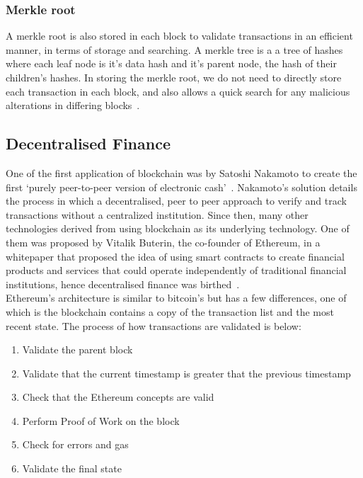 \subsubsection{Merkle root}
A merkle root is also stored in each block to validate transactions in an efficient manner, in terms of storage and searching. A merkle tree is a a tree of hashes where each leaf node is it's data hash and it's parent node, the hash of their children's hashes. In storing the merkle root, we do not need to directly store each transaction in each block, and also allows a quick search for any malicious alterations in differing blocks~\cite{noauthor_merkle_nodate}.

\subsection{Decentralised Finance}
One of the first application of blockchain was by Satoshi Nakamoto to create the first `purely peer-to-peer version of electronic cash'~\cite{nakamoto2009bitcoin}. Nakamoto's solution details the process in which a decentralised, peer to peer approach to verify and track transactions without a centralized institution. Since then, many other technologies derived from using blockchain as its underlying technology. One of them was proposed by Vitalik Buterin, the co-founder of Ethereum, in a whitepaper that proposed the idea of using smart contracts to create financial products and services that could operate independently of traditional financial institutions, hence decentralised finance was birthed~\cite{buterin2014next}.
\\[5mm]
Ethereum's architecture is similar to bitcoin's but has a few differences, one of which is the blockchain contains a copy of the transaction list and the most recent state. The process of how transactions are validated is below:
\begin{enumerate}
    \itemsep0em
    \item Validate the parent block
    \item Validate that the current timestamp is greater that the previous timestamp
    \item Check that the Ethereum concepts are valid
    \item Perform Proof of Work on the block
    \item Check for errors and gas
    \item Validate the final state
\end{enumerate}

